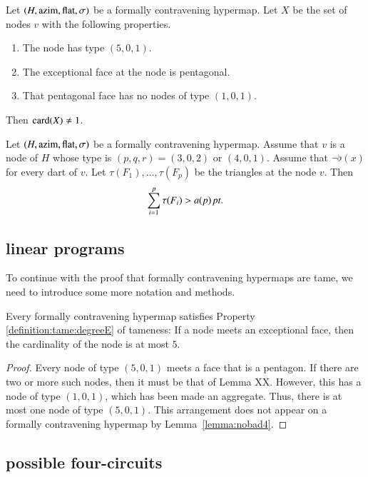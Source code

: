 \begin{lemma}
Let $(H,{\operatorname{azim}},\operatorname{flat},\sigma)$ be a formally contravening hypermap.
Let $X$ be the set of nodes $v$ with the following properties.
    \begin{enumerate}
    \item The node has type $(5,0,1)$.
    \item The exceptional face at the node is pentagonal.
    \item That pentagonal face has no nodes of type $(1,0,1)$.
    \end{enumerate}
Then ${\operatorname{card}}(X)\ne 1$.
\end{lemma}


\begin{lemma}  Let $(H,{\operatorname{azim}},\operatorname{flat},\sigma)$ be a formally contravening
hypermap. Assume that $v$ is a node of $H$ whose type is
$(p,q,r)=(3,0,2)$ or $(4,0,1)$.  Assume that $\neg\flat(x)$ for
every dart of $v$.  Let $\tau(F_1),\ldots,\tau(F_p)$ be the
triangles at the node $v$.  Then
    $$
    \sum_{i=1}^p \tau(F_i) > a(p)\,\hbox{\it pt}.
    $$
\end{lemma}




\subsection{linear programs} %
\label{sec:2.2}  To continue with the proof that formally
contravening hypermaps are tame, we need to introduce some more
notation and methods.

\begin{lemma} \label{lemma:deg5}
Every formally contravening hypermap satisfies Property
\ref{definition:tame:degreeE} of tameness: If a node meets an
exceptional face, then the cardinality of the node is at most $5$.
\end{lemma}

\begin{proof} Every node of type $(5,0,1)$ meets a face that is a pentagon.
If there are two or more such nodes, then it must be that of Lemma
XX.  However, this has a node of type $(1,0,1)$, which has been
made an aggregate.  Thus, there is at most one node of type $(5,0,1)$.
This arrangement does not appear on a formally contravening hypermap
by Lemma~\ref{lemma:nobad4}.
\end{proof}

\subsection{possible four-circuits}

